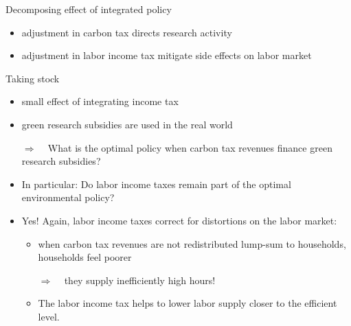\documentclass[11pt,aspectratio=169]{beamer}
\newcommand{\ar}{$\Rightarrow$ \ }
\begin{document}
\begin{frame}{Decomposing effect of integrated policy }
\begin{figure}
\begin{subfigure}{0.45\textwidth}
	\end{subfigure}
\end{figure}
\vspace{3mm}
\begin{block}{}
	\begin{itemize}
		\item adjustment in carbon tax directs research activity 
		\item adjustment in labor income tax mitigate side effects on labor market
	\end{itemize}
\end{block}	
\end{frame}

\begin{frame}{Taking stock}
	\begin{itemize}
		\item small effect of integrating income tax
		\item green research subsidies are used in the real world
		\item[\ar]  What is the optimal policy when carbon tax revenues finance green research subsidies?
		\item In particular: Do labor income taxes remain part of the optimal environmental policy?
		\item Yes! Again, labor income taxes correct for distortions on the labor market:
		\begin{itemize}
			\item when carbon tax revenues are not redistributed lump-sum to households, households feel poorer
			\item[\ar] they supply inefficiently high hours!
			\item The labor income tax helps to lower labor supply closer to the efficient level.
		\end{itemize}
	\end{itemize}
\end{frame}
\end{document}
